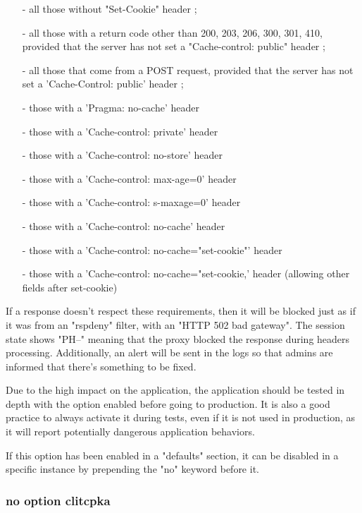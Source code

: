 \begin{itemize}
\item[-] all those without "Set-Cookie" header ;
\item[-] all those with a return code other than 200, 203, 206, 300, 301, 410,
      provided that the server has not set a "Cache-control: public" header ;
\item[-] all those that come from a POST request, provided that the server has not
      set a 'Cache-Control: public' header ;
\item[-] those with a 'Pragma: no-cache' header
\item[-] those with a 'Cache-control: private' header
\item[-] those with a 'Cache-control: no-store' header
\item[-] those with a 'Cache-control: max-age=0' header
\item[-] those with a 'Cache-control: s-maxage=0' header
\item[-] those with a 'Cache-control: no-cache' header
\item[-] those with a 'Cache-control: no-cache="set-cookie"' header
\item[-] those with a 'Cache-control: no-cache="set-cookie,' header
      (allowing other fields after set-cookie)
\end{itemize}

  If a response doesn't respect these requirements, then it will be blocked
  just as if it was from an "rspdeny" filter, with an "HTTP 502 bad gateway".
  The session state shows "PH--" meaning that the proxy blocked the response
  during headers processing. Additionally, an alert will be sent in the logs so
  that admins are informed that there's something to be fixed.

  Due to the high impact on the application, the application should be tested
  in depth with the option enabled before going to production. It is also a
  good practice to always activate it during tests, even if it is not used in
  production, as it will report potentially dangerous application behaviors.

  If this option has been enabled in a "defaults" section, it can be disabled
  in a specific instance by prepending the "no" keyword before it.

\subsubsection[clitcpka]{}
\subsubsection*{no option clitcpka}

